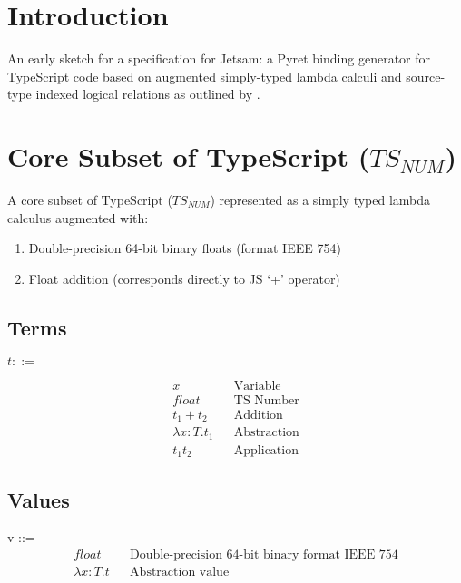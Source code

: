 \documentclass{article}
\begin{document}
	
	\tableofcontents
	\pagebreak
	
	\section{Introduction}
	An early sketch for a specification for Jetsam: a Pyret binding generator for TypeScript code based on augmented simply-typed lambda calculi and source-type indexed logical relations as outlined by \textcite{FFI}.
	
	\section{Core Subset of TypeScript ($TS_{NUM}$)}
	
	A core subset of TypeScript ($TS_{NUM}$) represented as a simply typed lambda calculus augmented with:
	\begin{enumerate}
		\item Double-precision 64-bit binary floats (format IEEE 754)
		\item Float addition (corresponds directly to JS `+' operator)
	\end{enumerate}
	
	\subsection{Terms}
	$t ::=$
	
	\begin{align*}
		x											&& \text{Variable}\\
		float  										&& \text{TS Number} \\
		t_1 + t_2 									&& \text{Addition} \\
		\lambda x\colon T.t_1						&& \text{Abstraction} \\
		t_1 t_2										&& \text{Application}
	\end{align*}


	\subsection{Values}
	v ::=
	\begin{align*}
		float										&& \text{Double-precision 64-bit binary format IEEE 754} \\
		\lambda x\colon T.t							&& \text{Abstraction value}
	\end{align*}
	
\end{document}
